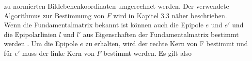 zu normierten Bildebenenkoordinaten umgerechnet werden\cite{HZ,phdextrinsicPara}.  Der verwendete Algorithmus zur Bestimmung von $F$ wird in Kapitel 3.3 näher beschrieben.\\












Wenn die Fundamentalmatrix bekannt ist können auch die Epipole $e$ und $e'$ und die Epipolarlinien $l$ und $l'$ aus Eigenschaften der Fundamentalmatrix bestimmt werden \cite{HZ,phdTwoView,HZ8,ZZGXr,phdextrinsicPara}. Um die Epipole $e$ zu erhalten, wird der rechte Kern von F bestimmt und für $e'$ muss der linke Kern von $F$ bestimmt werden\cite{HZ,phdTwoView,HZ8,ZZGXr,phdextrinsicPara}. Es gilt also%

